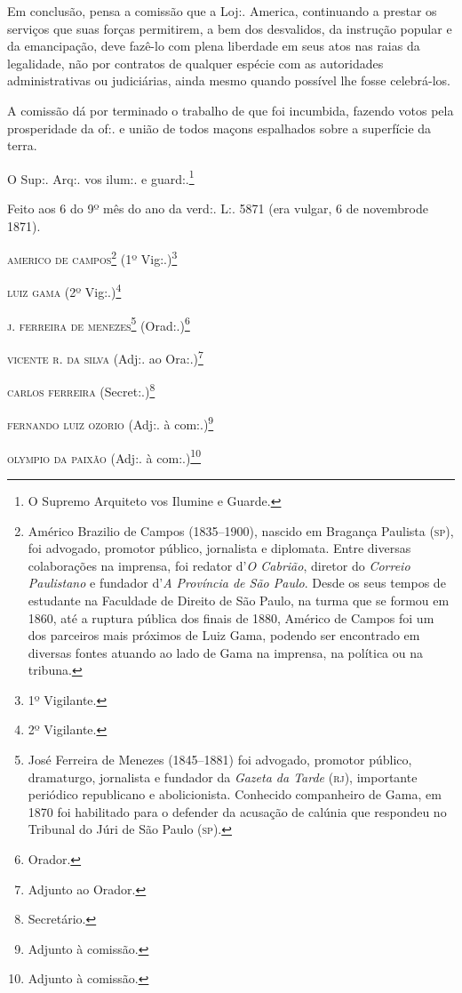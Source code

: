 Em conclusão, pensa a comissão que a Loj:. America, continuando a
prestar os serviços que suas forças permitirem, a bem dos desvalidos, da
instrução popular e da emancipação, deve fazê-lo com plena liberdade em
seus atos nas raias da legalidade, não por contratos de qualquer espécie
com as autoridades administrativas ou judiciárias, ainda mesmo quando
possível lhe fosse celebrá-los.

A comissão dá por terminado o trabalho de que foi incumbida, fazendo
votos pela prosperidade da of:. e união de todos maçons espalhados sobre
a superfície da terra.

O Sup:. Arq:. vos ilum:. e guard:.\footnote{ O Supremo Arquiteto vos
  Ilumine e Guarde.}

Feito aos 6 do 9º mês do ano da verd:. L:. 5871 (era vulgar, 6 de
novembrode 1871).

\begin{flushright}
\textsc{americo de campos}\footnote{ Américo Brazilio de Campos (1835--1900),
  nascido em Bragança Paulista (\textsc{sp}), foi advogado, promotor público,
  jornalista e diplomata. Entre diversas colaborações na imprensa, foi
  redator d'\emph{O Cabrião}, diretor do \emph{Correio Paulistano} e
  fundador d'\emph{A Província de São Paulo}. Desde os seus tempos de
  estudante na Faculdade de Direito de São Paulo, na turma que se formou
  em 1860, até a ruptura pública dos finais de 1880, Américo de Campos
  foi um dos parceiros mais próximos de Luiz Gama, podendo ser
  encontrado em diversas fontes atuando ao lado de Gama na imprensa, na
  política ou na tribuna.} (1º Vig:.)\footnote{ 1º Vigilante.}

\textsc{luiz gama} (2º Vig:.)\footnote{ 2º Vigilante.}

\textsc{j. ferreira de menezes}\footnote{ José Ferreira de Menezes (1845--1881)
  foi advogado, promotor público, dramaturgo, jornalista e fundador da
  \emph{Gazeta da Tarde} (\textsc{rj}), importante periódico republicano e
  abolicionista. Conhecido companheiro de Gama, em 1870 foi habilitado
  para o defender da acusação de calúnia que respondeu no Tribunal do
  Júri de São Paulo (\textsc{sp}).} (Orad:.)\footnote{ Orador.}

\textsc{vicente r. da silva} (Adj:. ao Ora:.)\footnote{ Adjunto ao Orador.}

\textsc{carlos ferreira} (Secret:.)\footnote{ Secretário.}

\textsc{fernando luiz ozorio} (Adj:. à com:.)\footnote{ Adjunto à comissão.}

\textsc{olympio da paixão} (Adj:. à com:.)\footnote{ Adjunto à comissão.}
\end{flushright}

